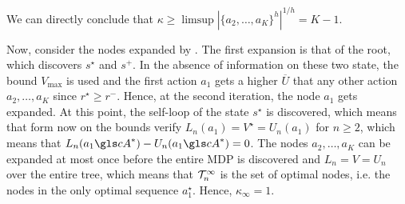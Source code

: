 \begin{subappendices}
We can directly conclude that $\kappa \geq \limsup{|\{a_2,\dots,a_K\}^h|^{1/h}} = K-1$.

Now, consider the nodes expanded by \GBOPD. The first expansion is that of the root, which discovers $s^\star$ and $s^+$. In the absence of information on these two state, the bound $V_{\max}$ is used and the first action $a_1$ gets a higher $\overline{U}$ that any other action $a_2,\dots,a_K$ since $r^\star \geq r^-$. Hence, at the second iteration, the node $a_1$ gets expanded. At this point, the self-loop of the state $s^\star$ is discovered, which means that form now on the bounds verify $L_n(a_1) = V^\star = U_n(a_1)$ for $n\geq2$, which means that $L_n(a_1\cA^*)-U_n(a_1\cA^*) = 0$. The nodes $a_2,\dots,a_K$ can be expanded at most once before the entire \gls{MDP} is discovered and $L_n=V=U_n$ over the entire tree, which means that $\mathcal{T}_n^\infty$ is the set of optimal nodes, i.e. the nodes in the only optimal sequence $a_1^\star$. Hence, $\kappa_\infty = 1.$ 
\end{subappendices}
